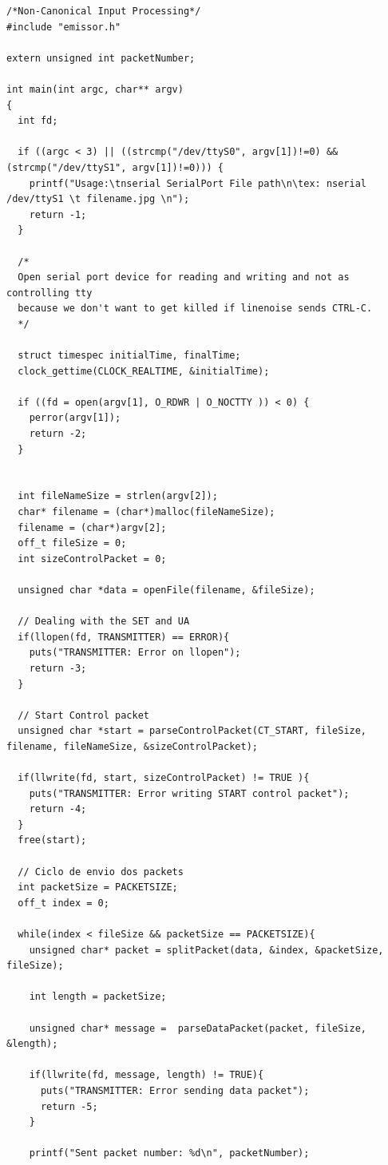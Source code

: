 \documentclass{article}
\begin{document}
\begin{lstlisting}[style=CStyle]
/*Non-Canonical Input Processing*/
#include "emissor.h"

extern unsigned int packetNumber;

int main(int argc, char** argv)
{
  int fd;

  if ((argc < 3) || ((strcmp("/dev/ttyS0", argv[1])!=0) && (strcmp("/dev/ttyS1", argv[1])!=0))) {
    printf("Usage:\tnserial SerialPort File path\n\tex: nserial /dev/ttyS1 \t filename.jpg \n");
    return -1;
  }

  /*
  Open serial port device for reading and writing and not as controlling tty
  because we don't want to get killed if linenoise sends CTRL-C.
  */
  
  struct timespec initialTime, finalTime;
  clock_gettime(CLOCK_REALTIME, &initialTime);

  if ((fd = open(argv[1], O_RDWR | O_NOCTTY )) < 0) {
    perror(argv[1]);
    return -2;
  }


  int fileNameSize = strlen(argv[2]);
  char* filename = (char*)malloc(fileNameSize);
  filename = (char*)argv[2];
  off_t fileSize = 0;
  int sizeControlPacket = 0;

  unsigned char *data = openFile(filename, &fileSize);

  // Dealing with the SET and UA
  if(llopen(fd, TRANSMITTER) == ERROR){
    puts("TRANSMITTER: Error on llopen");
    return -3;
  }

  // Start Control packet
  unsigned char *start = parseControlPacket(CT_START, fileSize, filename, fileNameSize, &sizeControlPacket);

  if(llwrite(fd, start, sizeControlPacket) != TRUE ){
    puts("TRANSMITTER: Error writing START control packet");
    return -4;
  }
  free(start);

  // Ciclo de envio dos packets
  int packetSize = PACKETSIZE;
  off_t index = 0;

  while(index < fileSize && packetSize == PACKETSIZE){
    unsigned char* packet = splitPacket(data, &index, &packetSize, fileSize);

    int length = packetSize;
    
    unsigned char* message =  parseDataPacket(packet, fileSize, &length);

    if(llwrite(fd, message, length) != TRUE){
      puts("TRANSMITTER: Error sending data packet");
      return -5;
    }

    printf("Sent packet number: %d\n", packetNumber);


\end{lstlisting}
\end{document}
